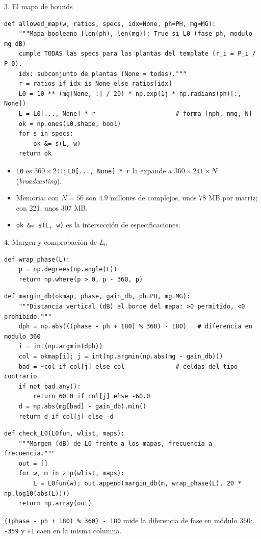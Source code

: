 \documentclass[aspectratio=169,11pt]{beamer}
\begin{document}
\begin{frame}[fragile]{3. El mapa de bounds}
\scriptsize
\begin{verbatim}
def allowed_map(w, ratios, specs, idx=None, ph=PH, mg=MG):
    """Mapa booleano [len(ph), len(mg)]: True si L0 (fase ph, modulo mg dB)
    cumple TODAS las specs para las plantas del template (r_i = P_i / P_0).
    idx: subconjunto de plantas (None = todas)."""
    r = ratios if idx is None else ratios[idx]
    L0 = 10 ** (mg[None, :] / 20) * np.exp(1j * np.radians(ph)[:, None])
    L = L0[..., None] * r                      # forma [nph, nmg, N]
    ok = np.ones(L0.shape, bool)
    for s in specs:
        ok &= s(L, w)
    return ok
\end{verbatim}

\footnotesize
\begin{itemize}
\item \texttt{L0} es $360\times241$; \texttt{L0[..., None] * r} la expande a $360\times241\times N$ (\emph{broadcasting}).
\item Memoria: con $N=56$ son $4.9$ millones de complejos, unos 78 MB por matriz; con 221, unos 307 MB.
\item \texttt{ok \&= s(L, w)} es la intersección de especificaciones.
\end{itemize}
\end{frame}

\begin{frame}[fragile]{4. Margen y comprobación de $L_0$}
\scriptsize
\begin{verbatim}
def wrap_phase(L):
    p = np.degrees(np.angle(L))
    return np.where(p > 0, p - 360, p)
\end{verbatim}
\scriptsize
\begin{verbatim}
def margin_db(okmap, phase, gain_db, ph=PH, mg=MG):
    """Distancia vertical (dB) al borde del mapa: >0 permitido, <0 prohibido."""
    dph = np.abs(((phase - ph + 180) % 360) - 180)   # diferencia en modulo 360
    i = int(np.argmin(dph))
    col = okmap[i]; j = int(np.argmin(np.abs(mg - gain_db)))
    bad = ~col if col[j] else col              # celdas del tipo contrario
    if not bad.any():
        return 60.0 if col[j] else -60.0
    d = np.abs(mg[bad] - gain_db).min()
    return d if col[j] else -d
\end{verbatim}
\scriptsize
\begin{verbatim}
def check_L0(L0fun, wlist, maps):
    """Margen (dB) de L0 frente a los mapas, frecuencia a frecuencia."""
    out = []
    for w, m in zip(wlist, maps):
        L = L0fun(w); out.append(margin_db(m, wrap_phase(L), 20 * np.log10(abs(L))))
    return np.array(out)
\end{verbatim}
\scriptsize \texttt{((phase - ph + 180) \% 360) - 180} mide la diferencia de fase en módulo 360: \texttt{-359} y \texttt{+1} caen en la misma columna.
\end{frame}
\end{document}
